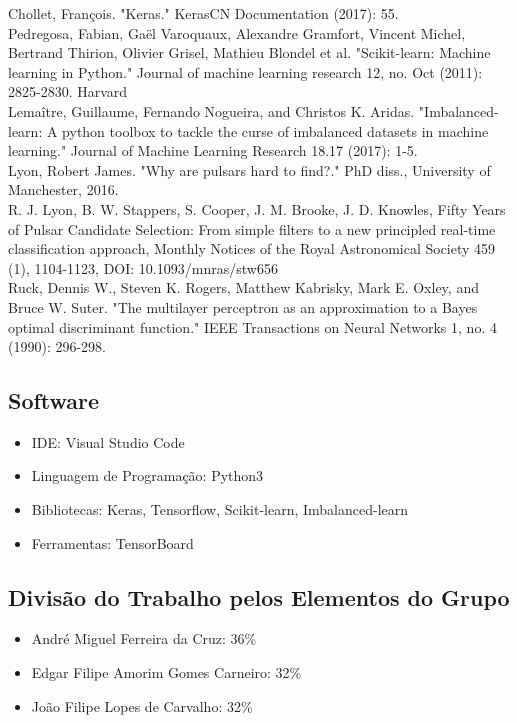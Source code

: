 \documentclass[]{article}
\begin{document}
Chollet, François. "Keras." KerasCN Documentation (2017): 55.
\\

Pedregosa, Fabian, Gaël Varoquaux, Alexandre Gramfort, Vincent Michel, Bertrand Thirion, Olivier Grisel, Mathieu Blondel et al. "Scikit-learn: Machine learning in Python." Journal of machine learning research 12, no. Oct (2011): 2825-2830.
Harvard	
\\

Lemaître, Guillaume, Fernando Nogueira, and Christos K. Aridas. "Imbalanced-learn: A python toolbox to tackle the curse of imbalanced datasets in machine learning." Journal of Machine Learning Research 18.17 (2017): 1-5.
\\

Lyon, Robert James. "Why are pulsars hard to find?." PhD diss., University of Manchester, 2016.
\\

R. J. Lyon, B. W. Stappers, S. Cooper, J. M. Brooke, J. D. Knowles, Fifty Years of Pulsar Candidate Selection: From simple filters to a new principled real-time classification approach, Monthly Notices of the Royal Astronomical Society 459 (1), 1104-1123, DOI: 10.1093/mnras/stw656
\\

Ruck, Dennis W., Steven K. Rogers, Matthew Kabrisky, Mark E. Oxley, and Bruce W. Suter. "The multilayer perceptron as an approximation to a Bayes optimal discriminant function." IEEE Transactions on Neural Networks 1, no. 4 (1990): 296-298.
\\

\subsection{Software}
\label{sec:software}
\begin{itemize}
  \item IDE: Visual Studio Code
  \item Linguagem de Programação: Python3
  \item Bibliotecas: Keras, Tensorflow, Scikit-learn, Imbalanced-learn
  \item Ferramentas: TensorBoard
\end{itemize}


\subsection{Divisão do Trabalho pelos Elementos do Grupo}
\begin{itemize}
  \item André Miguel Ferreira da Cruz: 36\% %
  \item Edgar Filipe Amorim Gomes Carneiro: 32\% 
  \item João Filipe Lopes de Carvalho: 32\%
\end{itemize}
\end{document}
